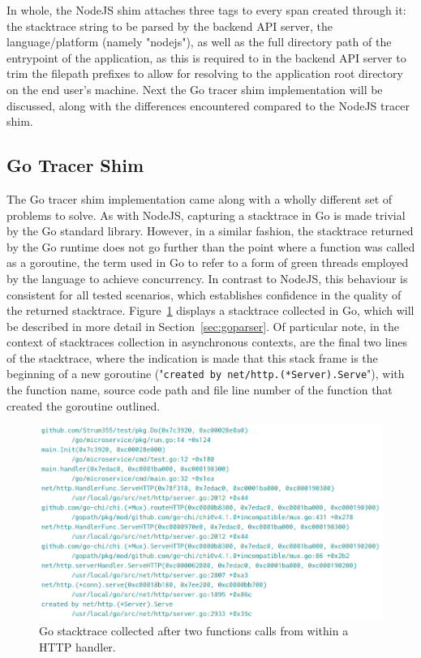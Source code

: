 \documentclass[12pt,pdftex,titlepage]{report}
\begin{document}
                In whole, the NodeJS shim attaches three tags to every span created through it: the stacktrace string to be parsed by the backend API server, the language/platform (namely "nodejs"), as well
                as the full directory path of the entrypoint of the application, as this is required to in the backend API server to trim the filepath prefixes to allow for resolving to the application
                root directory on the end user's machine. Next the Go tracer shim implementation will be discussed, along with the differences encountered compared to the NodeJS tracer shim.

            \subsection{Go Tracer Shim}
                The Go tracer shim implementation came along with a wholly different set of problems to solve. As with NodeJS, capturing a stacktrace in Go is made trivial by the Go standard library. However,
                in a similar fashion, the stacktrace returned by the Go runtime does not go further than the point where a function was called as a goroutine\cite{goroutine}, the term used in Go to refer to a 
                form of green threads employed by the language to achieve concurrency. In contrast to NodeJS, this behaviour is consistent for all tested scenarios, which establishes confidence in the quality 
                of the returned stacktrace. Figure~\ref{fig:gostack} displays a stacktrace collected in Go, which will be described in more detail in Section~\ref{sec:goparser}. Of particular note, in the context
                of stacktraces collection in asynchronous contexts, are the final two lines of the stacktrace, where the indication is made that this stack frame is the beginning of a new goroutine ("\texttt{created
                by net/http.(*Server).Serve}"), with the function name, source code path and file line number of the function that created the goroutine outlined.

                \begin{figure}[hbt!]
                    \centering
                    \includegraphics[scale=0.4]{gostack.png}
                    \caption[Screenshot of Go stacktrace collected in a HTTP request]{Go stacktrace collected after two functions calls from within a HTTP handler.}
                    \label{fig:gostack}
                \end{figure}
\end{document}
